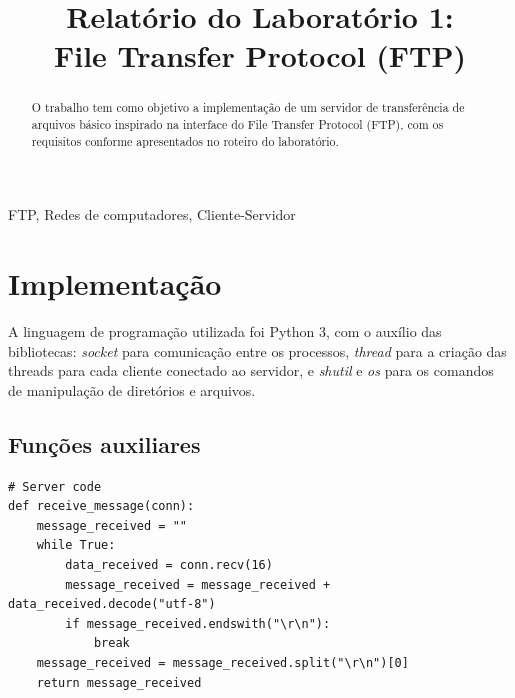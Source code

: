 \documentclass[conference]{IEEEtran}
\begin{document}
\title{Relatório do Laboratório 1: \\ File Transfer Protocol (FTP)\\
}

\author{
}

\maketitle

\begin{abstract}
O trabalho tem como objetivo a implementação de um servidor de transferência de arquivos básico inspirado na interface do File Transfer Protocol (FTP), com os requisitos conforme apresentados no roteiro do laboratório.
\end{abstract}

\begin{IEEEkeywords}
FTP, Redes de computadores, Cliente-Servidor
\end{IEEEkeywords}

\section{Implementação}

A linguagem de programação utilizada foi Python 3, com o auxílio das bibliotecas: \textit{socket} para comunicação entre os processos, \textit{thread} para a criação das threads para cada cliente conectado ao servidor, e \textit{shutil} e \textit{os} para os comandos de manipulação de diretórios e arquivos.

\subsection{Funções auxiliares}

\begin{lstlisting}
# Server code
def receive_message(conn):
    message_received = ""
    while True:
        data_received = conn.recv(16)
        message_received = message_received + data_received.decode("utf-8")
        if message_received.endswith("\r\n"):
            break
    message_received = message_received.split("\r\n")[0]
    return message_received
\end{lstlisting}
\end{document}
